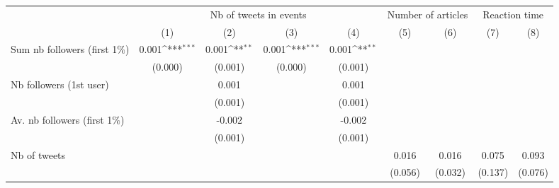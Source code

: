 {
\def\sym#1{\ifmmode^{#1}\else\(^{#1}\)\fi}
\begin{tabular}{l*{8}{c}}
\hline\hline
                    &\multicolumn{4}{c}{Nb of tweets in events}                                             &\multicolumn{2}{c}{Number of articles}     &\multicolumn{2}{c}{Reaction time}          \\\cmidrule(lr){2-5}\cmidrule(lr){6-7}\cmidrule(lr){8-9}
                    &\multicolumn{1}{c}{(1)}         &\multicolumn{1}{c}{(2)}         &\multicolumn{1}{c}{(3)}         &\multicolumn{1}{c}{(4)}         &\multicolumn{1}{c}{(5)}         &\multicolumn{1}{c}{(6)}         &\multicolumn{1}{c}{(7)}         &\multicolumn{1}{c}{(8)}         \\
\hline
Sum nb followers (first 1$\%$)&       0.001\sym{***}&       0.001\sym{**} &       0.001\sym{***}&       0.001\sym{**} &                     &                     &                     &                     \\
                    &     (0.000)         &     (0.001)         &     (0.000)         &     (0.001)         &                     &                     &                     &                     \\
Nb followers (1st user)&                     &       0.001         &                     &       0.001         &                     &                     &                     &                     \\
                    &                     &     (0.001)         &                     &     (0.001)         &                     &                     &                     &                     \\
Av. nb followers (first 1$\%$)&                     &      -0.002         &                     &      -0.002         &                     &                     &                     &                     \\
                    &                     &     (0.001)         &                     &     (0.001)         &                     &                     &                     &                     \\
Nb of tweets        &                     &                     &                     &                     &       0.016         &       0.016         &       0.075         &       0.093         \\
                    &                     &                     &                     &                     &     (0.056)         &     (0.032)         &     (0.137)         &     (0.076)         \\

\end{tabular}}
